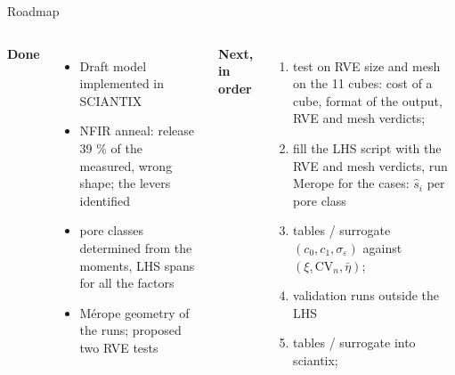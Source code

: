 \documentclass[10pt,aspectratio=169]{beamer}
\newcommand{\dd}[1]{{\color{done}#1}}    %
\begin{document}
\begin{frame}{Roadmap}
\footnotesize
\begin{columns}[T]
\dd{\textbf{Done}}
\begin{itemize}
\item Draft model implemented in SCIANTIX 
\item NFIR anneal: release 39 \% of the measured, wrong shape; the levers identified
\item pore classes determined from the moments, LHS spans for all the factors
\item M\'erope geometry of the runs; proposed two RVE tests
\end{itemize}
\vspace{4pt}
\textbf{Next, in order}
\begin{enumerate}
\item test on RVE size and mesh on the 11 cubes: cost of a cube, format of the output, RVE and mesh verdicts;
\item fill the LHS script with the RVE and mesh verdicts, run Merope for the cases: $\hat s_i$ per pore class
\item tables / surrogate $(c_0,c_1,\sigma_\varepsilon)$ against $(\xi,\mathrm{CV}_n,\bar\eta)$; 
\item validation runs outside the LHS
\item tables / surrogate into sciantix;
\end{enumerate}
\end{columns}
\end{frame}
\end{document}
